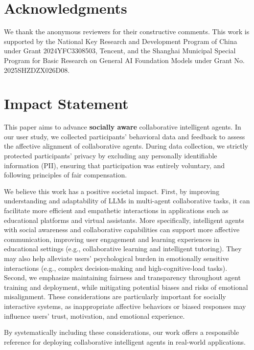 \documentclass{article}
\theoremstyle{plain}
\theoremstyle{definition}
\theoremstyle{remark}
\begin{document}
\section*{Acknowledgments}
We thank the anonymous reviewers for their constructive comments. This work is supported by the National Key Research and Development Program of China under Grant 2024YFC3308503, Tencent, and the Shanghai Municipal Special Program for Basic Research on General AI Foundation Models under Grant No. 2025SHZDZX026D08.
\section*{Impact Statement}



This paper aims to advance \textbf{socially aware} collaborative intelligent agents. In our user study, we collected participants' behavioral data and feedback to assess the affective alignment of collaborative agents. During data collection, we strictly protected participants' privacy by excluding any personally identifiable information (PII), ensuring that participation was entirely voluntary, and following principles of fair compensation.

We believe this work has a positive societal impact. First, by improving understanding and adaptability of LLMs in multi-agent collaborative tasks, it can facilitate more efficient and empathetic interactions in applications such as educational platforms and virtual assistants. More specifically, intelligent agents with social awareness and collaborative capabilities can support more affective communication, improving user engagement and learning experiences in educational settings (e.g., collaborative learning and intelligent tutoring). They may also help alleviate users’ psychological burden in emotionally sensitive interactions (e.g., complex decision-making and high-cognitive-load tasks). Second, we emphasize maintaining fairness and transparency throughout agent training and deployment, while mitigating potential biases and risks of emotional misalignment. These considerations are particularly important for socially interactive systems, as inappropriate affective behaviors or biased responses may influence users’ trust, motivation, and emotional experience.

By systematically including these considerations, our work offers a responsible reference for deploying collaborative intelligent agents in real-world applications.



\end{document}
